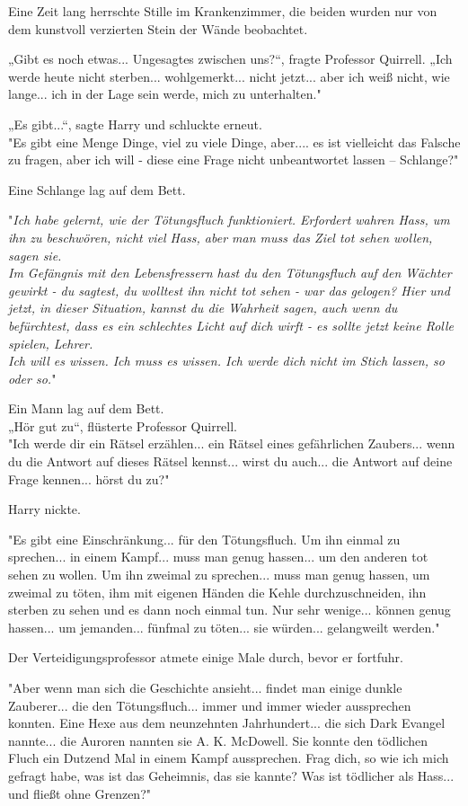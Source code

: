 {Eine Zeit lang herrschte Stille im Krankenzimmer, die beiden wurden nur von dem kunstvoll verzierten Stein der Wände beobachtet.

„Gibt es noch etwas... Ungesagtes zwischen uns?“, fragte Professor Quirrell. „Ich werde heute nicht sterben... wohlgemerkt... nicht jetzt... aber ich weiß nicht, wie lange... ich in der Lage sein werde, mich zu unterhalten."

„Es gibt...“, sagte Harry und schluckte erneut.\\ "Es gibt eine Menge Dinge, viel zu viele Dinge, aber.... es ist vielleicht das Falsche zu fragen, aber ich will - diese eine Frage nicht unbeantwortet lassen -- Schlange?"

Eine Schlange lag auf dem Bett.

"\emph{Ich habe gelernt, wie der Tötungsfluch funktioniert. Erfordert wahren Hass, um ihn zu beschwören, nicht viel Hass, aber man muss das Ziel tot sehen wollen, sagen sie.\\ Im Gefängnis mit den Lebensfressern hast du den Tötungsfluch auf den Wächter gewirkt - du sagtest, du wolltest ihn nicht tot sehen - war das gelogen? Hier und jetzt, in dieser Situation, kannst du die Wahrheit sagen, auch wenn du befürchtest, dass es ein schlechtes Licht auf dich wirft - es sollte jetzt keine Rolle spielen, Lehrer.\\ Ich will es wissen. Ich muss es wissen. Ich werde dich nicht im Stich lassen, so oder so.}"

Ein Mann lag auf dem Bett.\\ „Hör gut zu“, flüsterte Professor Quirrell.\\ "Ich werde dir ein Rätsel erzählen... ein Rätsel eines gefährlichen Zaubers... wenn du die Antwort auf dieses Rätsel kennst... wirst du auch... die Antwort auf deine Frage kennen... hörst du zu?"

Harry nickte.

"Es gibt eine Einschränkung... für den Tötungsfluch. Um ihn einmal zu sprechen... in einem Kampf... muss man genug hassen... um den anderen tot sehen zu wollen. Um ihn zweimal zu sprechen... muss man genug hassen, um zweimal zu töten, ihm mit eigenen Händen die Kehle durchzuschneiden, ihn sterben zu sehen und es dann noch einmal tun. Nur sehr wenige... können genug hassen... um jemanden... fünfmal zu töten... sie würden... gelangweilt werden."

Der Verteidigungsprofessor atmete einige Male durch, bevor er fortfuhr.

"Aber wenn man sich die Geschichte ansieht... findet man einige dunkle Zauberer... die den Tötungsfluch... immer und immer wieder aussprechen konnten. Eine Hexe aus dem neunzehnten Jahrhundert... die sich Dark Evangel nannte... die Auroren nannten sie A. K. McDowell. Sie konnte den tödlichen Fluch ein Dutzend Mal in einem Kampf aussprechen. Frag dich, so wie ich mich gefragt habe, was ist das Geheimnis, das sie kannte? Was ist tödlicher als Hass... und fließt ohne Grenzen?"

}
